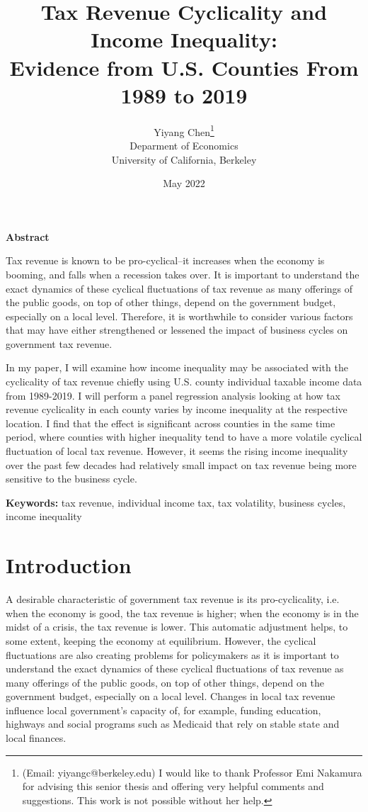 \documentclass{article}
\title{%
  Tax Revenue Cyclicality and Income Inequality: \\
  Evidence from U.S. Counties From 1989 to 2019 \\
  \vspace{5mm}
  }
\author{
    Yiyang Chen\footnote{\normalsize{(Email: yiyangc@berkeley.edu) I would like to thank Professor Emi Nakamura for advising this senior thesis and offering very helpful comments and suggestions. This work is not possible without her help.} } 
    \vspace{5mm}
    \\
    Deparment of Economics \\
    University of California, Berkeley
}
\date{May 2022}
\begin{document}
\maketitle

\pagebreak


\begin{center}
\textbf{Abstract}
\end{center}

Tax revenue is known to be pro-cyclical--it increases when the economy is booming, and falls when a recession takes over. It is important to understand the exact dynamics of these cyclical fluctuations of tax revenue as many offerings of the public goods, on top of other things, depend on the government budget, especially on a local level. Therefore, it is worthwhile to consider various factors that may have either strengthened or lessened the impact of business cycles on government tax revenue. 

In my paper, I will examine how income inequality may be associated with the cyclicality of tax revenue chiefly using U.S. county individual taxable income data from 1989-2019. I will perform a panel regression analysis looking at how tax revenue cyclicality in each county varies by income inequality at the respective location. I find that the effect is significant across counties in the same time period, where counties with higher inequality tend to have a more volatile cyclical fluctuation of local tax revenue. However, it seems the rising income inequality over the past few decades had relatively small impact on tax revenue being more sensitive to the business cycle. 

\begin{flushleft}
\textbf{Keywords:} tax revenue, individual income tax, tax volatility, business cycles, income inequality
\end{flushleft}

\pagebreak



\section{Introduction}

A desirable characteristic of government tax revenue is its pro-cyclicality, i.e. when the economy is good, the tax revenue is higher; when the economy is in the midst of a crisis, the tax revenue is lower. This automatic adjustment helps, to some extent, keeping the economy at equilibrium. However, the cyclical fluctuations are also creating problems for policymakers as it is important to understand the exact dynamics of these cyclical fluctuations of tax revenue as many offerings of the public goods, on top of other things, depend on the government budget, especially on a local level. Changes in local tax revenue influence local government's capacity of, for example, funding education, highways and social programs such as Medicaid that rely on stable state and local finances. 
\end{document}
